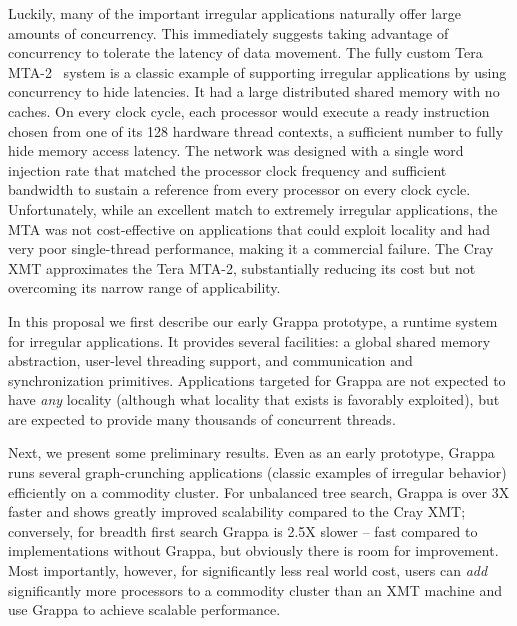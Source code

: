 
Luckily, many of the important irregular applications naturally offer large
amounts of concurrency. This immediately suggests taking advantage of
concurrency to tolerate the latency of data movement. The fully custom Tera
MTA-2~\cite{tera:mta1} system is a classic example of supporting irregular
applications by using concurrency to hide latencies. It had a large
distributed shared memory with no caches. On every clock cycle, each processor
would execute a ready instruction chosen from one of its 128 hardware thread
contexts, a sufficient number to fully hide memory access latency. The network
was designed with a single word injection rate that matched the processor
clock frequency and sufficient bandwidth to sustain a reference from every
processor on every clock cycle. Unfortunately, while an excellent match to
extremely irregular applications, the MTA was not cost-effective on
applications that could exploit locality and had very poor single-thread
performance, making it a commercial failure. The Cray XMT approximates the
Tera MTA-2, substantially reducing its cost but not overcoming its narrow
range of applicability.

In this proposal we first describe our early
Grappa prototype, a runtime system for irregular
applications. It provides several facilities: a global shared memory
abstraction, user-level threading support, and communication and
synchronization primitives. Applications targeted for Grappa are not expected
to have \emph{any} locality (although what locality that exists is favorably
exploited), but are expected to provide many thousands of concurrent threads.

Next, we present some preliminary results. Even as an early prototype, Grappa
runs several graph-crunching applications (classic examples of irregular
behavior) efficiently on a commodity cluster. For unbalanced tree search,
Grappa is over 3X faster and shows greatly improved scalability compared to
the Cray XMT; conversely, for breadth first search Grappa is 2.5X slower --
fast compared to implementations without Grappa, but obviously there is room
for improvement. Most importantly, however, for significantly less real world
cost, users can \emph{add} significantly more processors to a commodity
cluster than an XMT machine and use Grappa to achieve scalable performance.

